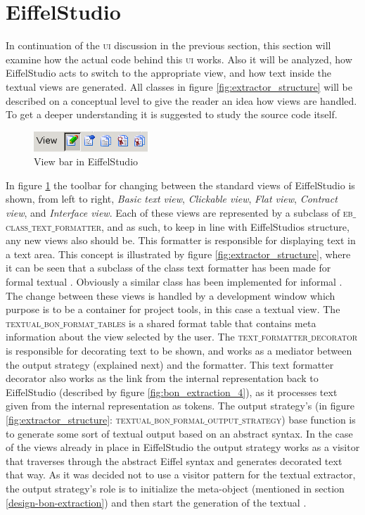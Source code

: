 \section{EiffelStudio}
\label{implementation_eiffelstudio}
In continuation of the \textsc{ui} discussion in the previous section, this section will examine how the actual code behind this \textsc{ui} works. Also it will be analyzed, how EiffelStudio acts to switch to the appropriate view, and how text inside the textual views are generated. All classes in figure \ref{fig:extractor_structure} will be described on a conceptual level to give the reader an idea how views are handled. To get a deeper understanding it is suggested to study the source code itself.

\begin{figure}[H]
\centering
\includegraphics[scale=0.8]{images/es0.png}
\caption{View bar in EiffelStudio}
\label{fig:EiffelStudio0}
\end{figure}

In figure \ref{fig:EiffelStudio0} the toolbar for changing between the standard views of EiffelStudio is shown, from left to right, \textit{Basic text view}, \textit{Clickable view}, \textit{Flat view}, \textit{Contract view}, and \textit{Interface view}. Each of these views are represented by a subclass of \textsc{eb$\_$class$\_$text$\_$formatter}, and as such, to keep in line with EiffelStudios structure, any new views also should be. This formatter is responsible for displaying text in a text area. This concept is illustrated by figure \ref{fig:extractor_structure}, where it can be seen that a subclass of the class text formatter has been made for formal textual \bon. Obviously a similar class has been implemented for informal \bon. The change between these views is handled by a development window which purpose is to be a container for project tools, in this case a textual view. The \textsc{textual$\_$bon$\_$format$\_$tables} is a shared format table that contains meta information about the view selected by the user. The \textsc{text$\_$formatter$\_$decorator} is responsible for decorating text to be shown, and works as a mediator between the output strategy (explained next) and the formatter. This text formatter decorator also works as the link from the internal representation back to EiffelStudio (described by figure \ref{fig:bon_extraction_4}), as it processes text given from the internal \bon{} representation as tokens. The output strategy's (in figure \ref{fig:extractor_structure}: \textsc{textual$\_$bon$\_$formal$\_$output$\_$strategy}) base function is to generate some sort of textual output based on an abstract syntax. In the case of the views already in place in EiffelStudio the output strategy works as a visitor that traverses through the abstract Eiffel syntax and generates decorated text that way. As it was decided not to use a visitor pattern for the textual \bon{} extractor, the output strategy's role is to initialize the meta-object (mentioned in section \ref{design-bon-extraction}) and then start the generation of the textual \bon.

